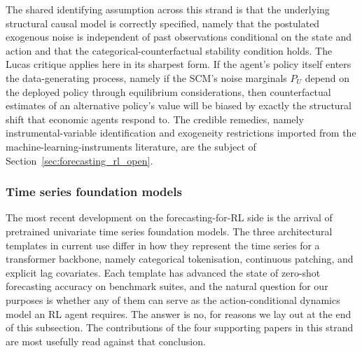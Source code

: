 The shared identifying assumption across this strand is that the underlying
structural causal model is correctly specified, namely that the postulated
exogenous noise is independent of past observations conditional on the state
and action and that the categorical-counterfactual stability condition holds.
The Lucas critique applies here in its sharpest form. If the agent's policy
itself enters the data-generating process, namely if the SCM's noise marginals
$P_U$ depend on the deployed policy through equilibrium considerations, then
counterfactual estimates of an alternative policy's value will be biased by
exactly the structural shift that economic agents respond to. The credible
remedies, namely instrumental-variable identification and exogeneity
restrictions imported from the machine-learning-instruments literature, are
the subject of Section~\ref{sec:forecasting_rl_open}.

\subsubsection{Time series foundation models}
\label{sec:tsfm}

The most recent development on the forecasting-for-RL side is the arrival of
pretrained univariate time series foundation models. The three architectural
templates in current use differ in how they represent the time series for a
transformer backbone, namely categorical tokenisation, continuous patching, and
explicit lag covariates. Each template has advanced the state of zero-shot
forecasting accuracy on benchmark suites, and the natural question for our
purposes is whether any of them can serve as the action-conditional dynamics
model an RL agent requires. The answer is no, for reasons we lay out at the end
of this subsection. The contributions of the four supporting papers in this
strand are most usefully read against that conclusion.

